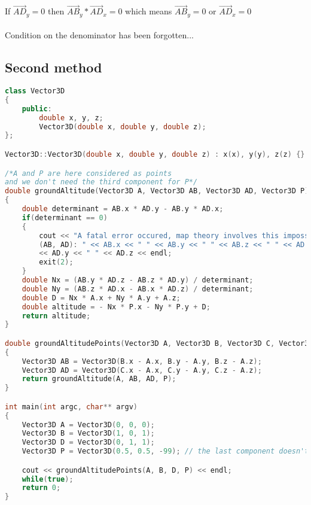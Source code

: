 \documentclass{article}
\begin{document}
			If $\overrightarrow{AD}_y = 0$ then $\overrightarrow{AB}_y * \overrightarrow{AD}_x = 0$ which means $\overrightarrow{AB}_y = 0$ or $\overrightarrow{AD}_x = 0$\\\\
			
			Condition on the denominator has been forgotten...
			
		\subsection{Second method}
		
		\begin{lstlisting}[language=C++, caption={Here is the implementation in C++ to compute the player altitude}]
class Vector3D
{
    public:
        double x, y, z;
        Vector3D(double x, double y, double z);
};

Vector3D::Vector3D(double x, double y, double z) : x(x), y(y), z(z) {}

/*A and P are here considered as points
and we don't need the third component for P*/
double groundAltitude(Vector3D A, Vector3D AB, Vector3D AD, Vector3D P)
{
	double determinant = AB.x * AD.y - AB.y * AD.x;
	if(determinant == 0)
	{
		cout << "A fatal error occured, map theory involves this impossibility
		(AB, AD): " << AB.x << " " << AB.y << " " << AB.z << " " << AD.x << " "
		<< AD.y << " " << AD.z << endl;
		exit(2);
	}
	double Nx = (AB.y * AD.z - AB.z * AD.y) / determinant;
	double Ny = (AB.z * AD.x - AB.x * AD.z) / determinant;
    double D = Nx * A.x + Ny * A.y + A.z;
	double altitude = - Nx * P.x - Ny * P.y + D;
	return altitude;
}

double groundAltitudePoints(Vector3D A, Vector3D B, Vector3D C, Vector3D P)
{
    Vector3D AB = Vector3D(B.x - A.x, B.y - A.y, B.z - A.z);
    Vector3D AD = Vector3D(C.x - A.x, C.y - A.y, C.z - A.z);
	return groundAltitude(A, AB, AD, P);
}

int main(int argc, char** argv)
{
    Vector3D A = Vector3D(0, 0, 0);
    Vector3D B = Vector3D(1, 0, 1);
    Vector3D D = Vector3D(0, 1, 1);
    Vector3D P = Vector3D(0.5, 0.5, -99); // the last component doesn't matter

    cout << groundAltitudePoints(A, B, D, P) << endl;
    while(true);
    return 0;
}
		\end{lstlisting}
	
\end{document}
